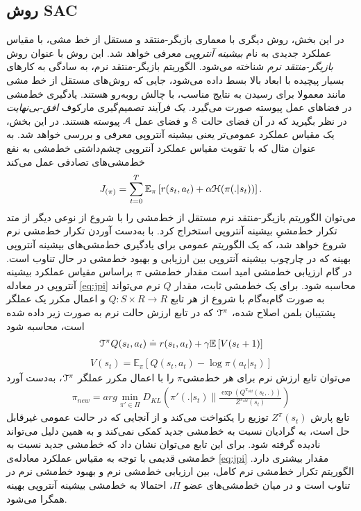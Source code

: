 \subsection{روش SAC}
در این بخش، روش دیگری با معماری  بازیگر-منتقد و مستقل از خط مشی، با مقیاس عملکرد جدیدی به نام
\textit{بیشینه آنتروپی}
معرفی خواهد شد.
این روش با عنوان روش	
\textit{بازیگر-منتقد نرم}
شناخته می‌شود.
الگوریتم  بازیگر-منتقد نرم، به سادگی به کارهای بسیار پیچیده با ابعاد بالا بسط داده می‌شود، جایی که روش‌های مستقل از خط مشی‌ مانند
معمولا برای رسیدن به نتایج مناسب، با چالش روبه‌رو هستند.
یادگیری خط‌مشی در فضاهای عمل پیوسته صورت می‌گیرد. یک فرآیند تصمیم‌گیری مارکوف 
\textit{افق-بی‌نهایت}
در نظر بگیرید که در آن فضای حالت
$\EuScript{S}$
و فضای عمل
$\EuScript{A}$
پیوسته هستند.
در این بخش، یک مقیاس عملکرد عمومی‌تر یعنی بیشینه آنتروپی معرفی و بررسی خواهد شد.
به عنوان مثال 
\cite{ziebart2010modeling}
که با تقویت مقیاس عملکرد آنتروپی چشم‌داشتی خط‌مشی به نفع خط‌مشی‌های تصادفی عمل می‌کند
\begin{align}
J_{(\pi)}= \sum\limits_{t=0}^T \mathbb{E}_\pi \left[ r(s_t , a_t) + \alpha \EuScript{H} (\pi(.|s_t)) \right].
\label{eq:jpi}
\end{align}
می‌توان الگوریتم بازیگر-منتقد نرم مستقل از خط‌مشی را با شروع از نوعی دیگر از متد تکرار خط‌مشیِ بیشینه آنتروپی استخراج کرد.
با به‌دست آوردن تکرار خط‌مشی نرم شروع خواهد شد، که یک الگوریتم عمومی برای یادگیری خط‌مشی‌های بیشینه آنتروپی بهینه که در چارچوب بیشینه آنتروپی بین ارزیابی و بهبود خط‌مشی در حال تناوب است.
در گام ارزیابی خط‌مشی امید است مقدار خط‌مشی
$\pi$
براساس مقیاس عملکرد بیشینه آنتروپی در معادله \ref{eq:jpi} محاسبه شود. برای یک خط‌مشی ثابت، مقدار $Q$  نرم می‌تواند به صورت گام‌به‌گام با شروع از هر تابع
$Q:S \times R \rightarrow R$ 
و اعمال مکرر یک عملگر پشتیبان بلمن اصلاح شده،
$\EuScript{T}^\pi$
که در تابع ارزش حالت نرم به صورت زیر داده شده است، محاسبه شود
\begin{align}
\EuScript{T}^\pi Q(s_t,a_t) \doteq r(s_t,a_t)+\gamma \mathbb{E} \left[ V(s_t+1) \right]
\label{eq:tpi}
\end{align}
\begin{align}
V(s_t)= \mathbb{E}_\pi \left[ Q(s_t,a_t)- \log \pi(a_t | s_t) \right]
\end{align}
می‌توان تابع ارزش نرم برای هر خط‌مشی$\pi$ را با اعمال مکرر عملگر 
$\EuScript{T}^\pi$،
 به‌دست آورد\\
\begin{align}
\pi_{new} = arg \min_{\pi' \in \Pi} D_{KL}  \left( \pi'(.|s_t) \parallel \frac{\exp{(Q^{\pi_{old}} (s_t,.))}}{Z^{\pi_{old}} (s_t)}\right)
\label{eq:pinew}
\end{align}
تابع پارش 
$Z^\pi (s_t)$
توزیع را یکنواخت می‌کند و از آنجایی که در حالت عمومی غیرقابل حل است، به گرادیان نسبت به خط‌مشی جدید کمکی نمی‌کند و به همین دلیل می‌تواند نادیده گرفته شود. برای این تابع می‌توان نشان داد که خط‌مشی جدید نسبت به خط‌مشی قدیمی با توجه به مقیاس عملکرد معادله‌ی \ref{eq:jpi} مقدار بیشتری دارد. 
الگوریتم تکرار خط‌مشی نرم کامل، بین ارزیابی خط‌مشی نرم و بهبود خط‌مشی نرم در تناوب است و در میان خط‌مشی‌های عضو
$\Pi$،
احتمالا به خط‌مشی بیشینه آنتروپی بهینه همگرا می‌شود.

